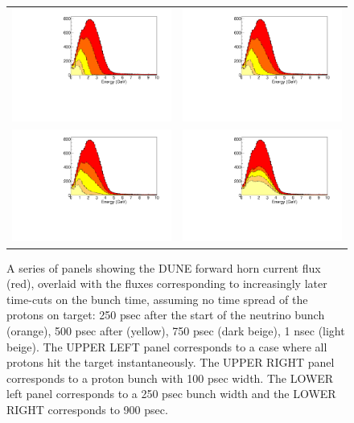\documentclass[preprint,12pt]{elsarticle}
\begin{document}
\begin{figure}[t]
	\begin{center}
           	\begin{tabular}{c c}	
           	\includegraphics[width=0.45 \linewidth]{Figures/10.10.18_LBNFtiming/DUNEbeam_truetimingB.pdf} &
			\includegraphics[width=0.45 \linewidth]{Figures/10.10.18_LBNFtiming/DUNEbeam_100psecB.pdf} \\
           	\includegraphics[width=0.45 \linewidth]{Figures/10.10.18_LBNFtiming/DUNEbeam_250psecB.pdf} &
			\includegraphics[width=0.45 \linewidth]{Figures/10.10.18_LBNFtiming/DUNEbeam_900psecB.pdf}
			 \\			
			\end{tabular}
	\end{center}
	\caption{A series of panels showing the DUNE forward horn current flux (red), overlaid with the fluxes corresponding to increasingly later time-cuts on the bunch time, assuming no time spread of the protons on target: 250 psec after the start of the neutrino bunch (orange), 500 psec after (yellow), 750 psec (dark beige), 1 nsec (light beige). The UPPER LEFT panel corresponds to a case where all protons hit the target instantaneously. The UPPER RIGHT panel corresponds to a proton bunch with 100 psec width. The LOWER left panel corresponds to a 250 psec bunch width and the LOWER RIGHT corresponds to 900 psec.}
		\label{fig:anniedetector}
\end{figure}
\end{document}
